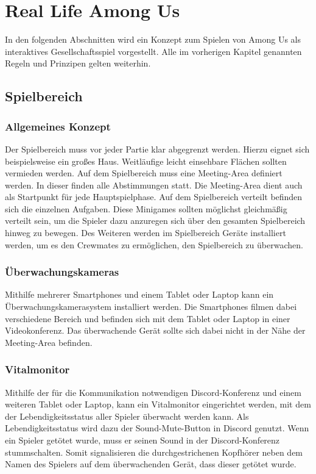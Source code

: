 \section{Real Life Among Us}
In den folgenden Abschnitten wird ein Konzept zum Spielen von Among Us als
interaktives Gesellschaftsspiel vorgestellt. Alle im vorherigen Kapitel
genannten Regeln und Prinzipen gelten weiterhin.

\subsection{Spielbereich}
\subsubsection{Allgemeines Konzept}
Der Spielbereich muss vor jeder Partie klar abgegrenzt werden. Hierzu eignet
sich beispielsweise ein großes Haus. Weitläufige leicht einsehbare Flächen
sollten vermieden werden.
\newline
Auf dem Spielbereich muss eine Meeting-Area definiert werden. In dieser finden
alle Abstimmungen statt. Die Meeting-Area dient auch als Startpunkt für jede
Hauptspielphase.
\newline
Auf dem Spielbereich verteilt befinden sich die einzelnen Aufgaben. Diese
Minigames sollten möglichst gleichmäßig verteilt sein, um die Spieler dazu
anzuregen sich über den gesamten Spielbereich hinweg zu bewegen.
\newline
Des Weiteren werden im Spielbereich Geräte installiert werden, um es den
Crewmates zu ermöglichen, den Spielbereich zu überwachen.

\subsubsection{Überwachungskameras}
Mithilfe mehrerer Smartphones und einem Tablet oder Laptop kann ein
Überwachungskamerasystem installiert werden. Die Smartphones filmen dabei
verschiedene Bereich und befinden sich mit dem Tablet oder Laptop in einer
Videokonferenz. Das überwachende Gerät sollte sich dabei nicht in der Nähe
der Meeting-Area befinden.

\subsubsection{Vitalmonitor}
Mithilfe der für die Kommunikation notwendigen Discord-Konferenz und einem
weiteren Tablet oder Laptop, kann ein Vitalmonitor eingerichtet werden, mit dem
der Lebendigkeitsstatus aller Spieler überwacht werden kann. Als
Lebendigkeitsstatus wird dazu der Sound-Mute-Button in Discord genutzt.
Wenn ein Spieler getötet wurde, muss er seinen Sound in der Discord-Konferenz
stummschalten.
Somit signalisieren die durchgestrichenen Kopfhörer neben dem Namen des Spielers
auf dem überwachenden Gerät, dass dieser getötet wurde.

